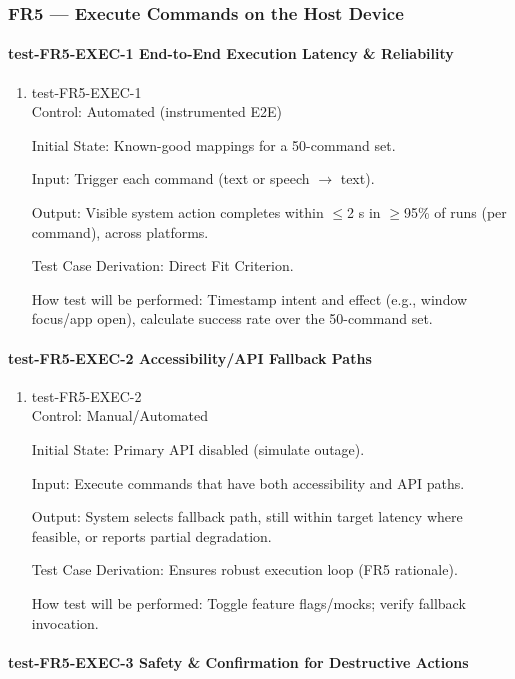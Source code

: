 \documentclass[12pt, titlepage]{article}
\begin{document}
\subsubsection{FR5 — Execute Commands on the Host Device}

\paragraph{test-FR5-EXEC-1 End-to-End Execution Latency \& Reliability}

\begin{enumerate}
\item{test-FR5-EXEC-1\\}
Control: Automated (instrumented E2E)

Initial State: Known-good mappings for a 50-command set.

Input: Trigger each command (text or speech $\rightarrow$ text).

Output: Visible system action completes within $\leq$2 s in $\geq$95\% of runs (per command), across platforms.

Test Case Derivation: Direct Fit Criterion.

How test will be performed: Timestamp intent and effect (e.g., window focus/app open), calculate success rate over the 50-command set.
\end{enumerate}

\paragraph{test-FR5-EXEC-2 Accessibility/API Fallback Paths}

\begin{enumerate}
\item{test-FR5-EXEC-2\\}
Control: Manual/Automated

Initial State: Primary API disabled (simulate outage).

Input: Execute commands that have both accessibility and API paths.

Output: System selects fallback path, still within target latency where feasible, or reports partial degradation.

Test Case Derivation: Ensures robust execution loop (FR5 rationale).

How test will be performed: Toggle feature flags/mocks; verify fallback invocation.
\end{enumerate}

\paragraph{test-FR5-EXEC-3 Safety \& Confirmation for Destructive Actions}
\end{document}
